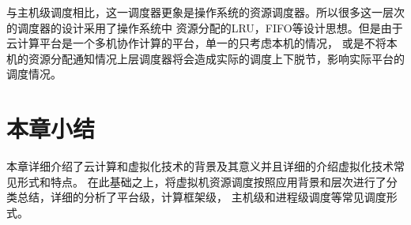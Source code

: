 与主机级调度相比，这一调度器更象是操作系统的资源调度器。所以很多这一层次的调度器的设计采用了操作系统中
资源分配的LRU，FIFO等设计思想。但是由于云计算平台是一个多机协作计算的平台，单一的只考虑本机的情况，
或是不将本机的资源分配通知情况上层调度器将会造成实际的调度上下脱节，影响实际平台的调度情况。











\section{本章小结}
 本章详细介绍了云计算和虚拟化技术的背景及其意义并且详细的介绍虚拟化技术常见形式和特点。
 在此基础之上，将虚拟机资源调度按照应用背景和层次进行了分类总结，详细的分析了平台级，计算框架级，
 主机级和进程级调度等常见调度形式。
